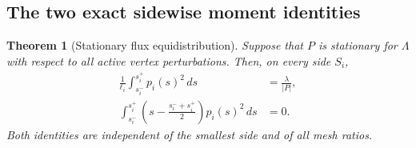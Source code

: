 \documentclass[11pt]{amsart}
\numberwithin{equation}{section}
\newtheorem{theorem}{Theorem}[section]
\theoremstyle{definition}
\theoremstyle{remark}
\begin{document}
\subsection{The two exact sidewise moment identities}

\begin{theorem}[Stationary flux equidistribution]\label{F57:thm:flux}
Suppose that $P$ is stationary for $\Lambda$ with respect to all active
vertex perturbations.  Then, on every side $S_i$,
\begin{align}
 \frac1{\ell_i}\int_{s_i^-}^{s_i^+}p_i(s)^2\,ds
 &=\frac{\lambda}{|P|},\label{F57:eq:mean}\\
 \int_{s_i^-}^{s_i^+}
 \left(s-\frac{s_i^-+s_i^+}{2}\right)p_i(s)^2\,ds
 &=0.\label{F57:eq:first-moment}
\end{align}
Both identities are independent of the smallest side and of all mesh
ratios.
\end{theorem}
\end{document}
